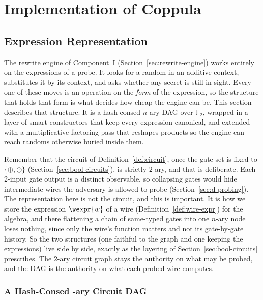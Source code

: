 \setlength{\parindent}{0pt}
\chapter{Implementation of Coppula}
\label{chap:implementation}
\section{Expression Representation}
\label{sec:expr-representation}

The rewrite engine of Component~I (Section~\ref{sec:rewrite-engine}) works
entirely on the expressions of a probe. It looks for a random in an additive
context, substitutes it by its context, and asks whether any secret is still in
sight. Every one of these moves is an operation on the \emph{form} of the
expression, so the structure that holds that form is what decides how cheap the
engine can be. This section describes that structure. It is a hash-consed
$n$-ary DAG over $\mathbb{F}_2$, wrapped in a layer of smart constructors that
keep every expression canonical, and extended with a multiplicative factoring
pass that reshapes products so the engine can reach randoms otherwise buried
inside them.

Remember that the circuit of Definition~\ref{def:circuit}, once the gate set is
fixed to $\{\oplus, \odot\}$ (Section~\ref{sec:bool-circuits}), is strictly
$2$-ary, and that is deliberate. Each
$2$-input gate output is a distinct observable, so collapsing gates would hide
intermediate wires the adversary is allowed to probe
(Section~\ref{sec:d-probing}). The representation here is not the circuit, and this is important.
It is how we store the expression $\wexpr{w}$ of a wire
(Definition~\ref{def:wire-expr}) for the algebra, and there flattening a
chain of same-typed gates into one $n$-ary node loses nothing, since only the
wire's function matters and not its gate-by-gate history. So the two structures
(one faithful to the graph and one keeping the expressions) live side
by side, exactly as the layering of Section~\ref{sec:bool-circuits} prescribes.
The $2$-ary circuit graph stays the authority on what may be probed, and the
DAG is the authority on what each probed wire computes.

  \subsection{A Hash-Consed -ary Circuit DAG}
  \label{sec:hash-consed-dag}

